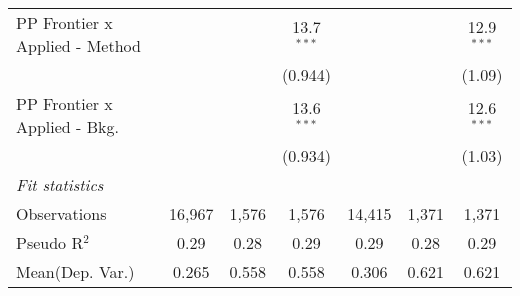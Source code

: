 \begin{tabular}{lcccccc}
   PP Frontier x Applied - Method &               &               & 13.7$^{***}$   &                &                & 12.9$^{***}$\\   
                                  &               &               & (0.944)        &                &                & (1.09)\\   
   PP Frontier x Applied - Bkg.   &               &               & 13.6$^{***}$   &                &                & 12.6$^{***}$\\   
                                  &               &               & (0.934)        &                &                & (1.03)\\   
   \midrule
   \emph{Fit statistics}\\
   Observations                   & 16,967        & 1,576         & 1,576          & 14,415         & 1,371          & 1,371\\  
   Pseudo R$^2$                   & 0.29          & 0.28          & 0.29           & 0.29           & 0.28           & 0.29\\  
Mean(Dep. Var.) & 0.265 & 0.558 & 0.558 & 0.306 & 0.621 & 0.621 \\
   

\end{tabular}
